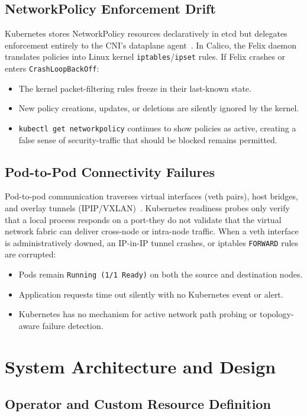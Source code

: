 \documentclass[conference]{IEEEtran}
\begin{document}
\subsection{NetworkPolicy Enforcement Drift}
Kubernetes stores NetworkPolicy resources declaratively in etcd but delegates enforcement entirely to the CNI's dataplane agent~\cite{calico-docs}. In Calico, the Felix daemon translates policies into Linux kernel \texttt{iptables}/\texttt{ipset} rules. If Felix crashes or enters \texttt{CrashLoopBackOff}:
\begin{itemize}
  \item The kernel packet-filtering rules freeze in their last-known state.
  \item New policy creations, updates, or deletions are silently ignored by the kernel.
  \item \texttt{kubectl get networkpolicy} continues to show policies as active, creating a false sense of security-traffic that should be blocked remains permitted.
\end{itemize}

\subsection{Pod-to-Pod Connectivity Failures}
Pod-to-pod communication traverses virtual interfaces (veth pairs), host bridges, and overlay tunnels (IPIP/VXLAN)~\cite{calico-docs}. Kubernetes readiness probes only verify that a local process responds on a port-they do not validate that the virtual network fabric can deliver cross-node or intra-node traffic. When a veth interface is administratively downed, an IP-in-IP tunnel crashes, or iptables \texttt{FORWARD} rules are corrupted:
\begin{itemize}
  \item Pods remain \texttt{Running (1/1 Ready)} on both the source and destination nodes.
  \item Application requests time out silently with no Kubernetes event or alert.
  \item Kubernetes has no mechanism for active network path probing or topology-aware failure detection.
\end{itemize}

\section{System Architecture and Design}

\subsection{Operator and Custom Resource Definition}
\end{document}
